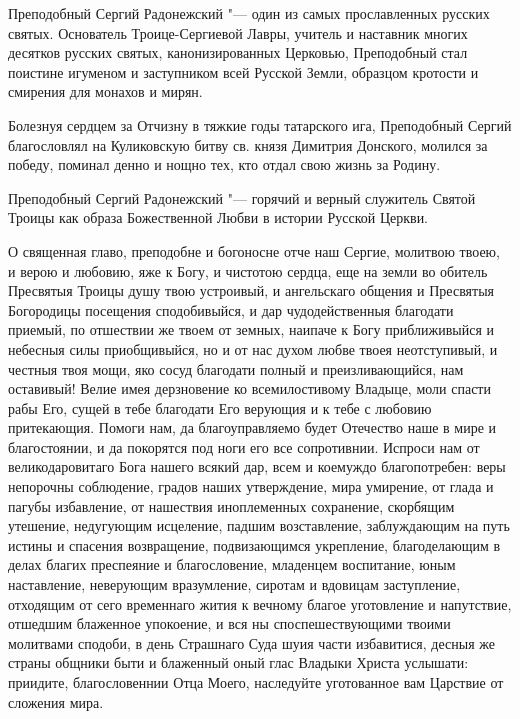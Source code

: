 \mychapterending

\begin{mymulticols}


Преподобный Сергий Радонежский "--- один из самых прославленных русских святых. Основатель Троице-Сергиевой Лавры, учитель и наставник многих десятков русских святых, канонизированных Церковью, Преподобный стал поистине игуменом и заступником всей Русской Земли, образцом кротости и смирения для монахов и мирян.

Болезнуя сердцем за Отчизну в тяжкие годы татарского ига, Преподобный Сергий благословлял на Куликовскую битву св. князя Димитрия Донского, молился за победу, поминал денно и нощно тех, кто отдал свою жизнь за Родину.




Преподобный Сергий Радонежский "--- горячий и верный служитель Святой Троицы как образа Божественной Любви в истории Русской Церкви.




О священная главо, преподобне и богоносне отче наш Сергие, молитвою твоею, и верою и любовию, яже к Богу, и чистотою сердца, еще на земли во обитель Пресвятыя Троицы душу твою устроивый, и ангельскаго общения и Пресвятыя Богородицы посещения сподобивыйся, и дар чудодейственныя благодати приемый, по отшествии же твоем от земных, наипаче к Богу приближивыйся и небесныя силы приобщивыйся, но и от нас духом любве твоея неотступивый, и честныя твоя мощи, яко сосуд благодати полный и преизливающийся, нам оставивый! Велие имея дерзновение ко всемилостивому Владыце, моли спасти рабы Его, сущей в тебе благодати Его верующия и к тебе с любовию притекающия. Помоги нам, да благоуправляемо будет Отечество наше в мире и благостоянии, и да покорятся под ноги его все сопротивнии. Испроси нам от великодаровитаго Бога нашего всякий дар, всем и коемуждо благопотребен: веры непорочны соблюдение, градов наших утверждение, мира умирение, от глада и пагубы избавление, от нашествия иноплеменных сохранение, скорбящим утешение, недугующим исцеление, падшим возставление, заблуждающим на путь истины и спасения возвращение, подвизающимся укрепление, благоделающим в делах благих преспеяние и благословение, младенцем воспитание, юным наставление, неверующим вразумление, сиротам и вдовицам заступление, отходящим от сего временнаго жития к вечному благое уготовление и напутствие, отшедшим блаженное упокоение, и вся ны споспешествующими твоими молитвами сподоби, в день Страшнаго Суда шуия части избавитися, десныя же страны общники быти и блаженный оный глас Владыки Христа услышати: приидите, благословеннии Отца Моего, наследуйте уготованное вам Царствие от сложения мира.

\end{mymulticols}

